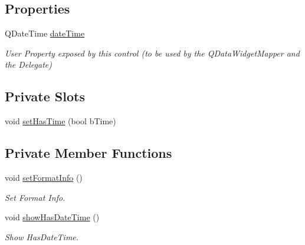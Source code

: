 \subsection*{Properties}
\begin{DoxyCompactItemize}
\item 
QDateTime \hyperlink{class_custom_time_ctrl_ad091ad8a573db0fdf17366547aab5695}{dateTime}
\begin{DoxyCompactList}\small\item\em User Property exposed by this control (to be used by the QDataWidgetMapper and the Delegate) \item\end{DoxyCompactList}\end{DoxyCompactItemize}
\subsection*{Private Slots}
\begin{DoxyCompactItemize}
\item 
void \hyperlink{class_custom_time_ctrl_ae8a64e667cf921232d5d940ef7a3fce1}{setHasTime} (bool bTime)
\end{DoxyCompactItemize}
\subsection*{Private Member Functions}
\begin{DoxyCompactItemize}
\item 
void \hyperlink{class_custom_time_ctrl_ad1519295bb4900bc8c35a0885475140b}{setFormatInfo} ()
\begin{DoxyCompactList}\small\item\em Set Format Info. \item\end{DoxyCompactList}\item 
void \hyperlink{class_custom_time_ctrl_a049b8611ab15ec4ad46a93e7306ecc95}{showHasDateTime} ()
\begin{DoxyCompactList}\small\item\em Show HasDateTime. \item\end{DoxyCompactList}\end{DoxyCompactItemize}
